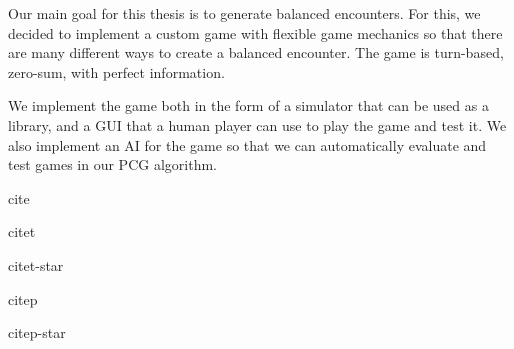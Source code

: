 Our main goal for this thesis is to generate balanced encounters. For this, we decided
to implement a custom game with flexible game mechanics so that there are many different
ways to create a balanced encounter. The game is turn-based, zero-sum, with perfect information.

We implement the game both in the form of a simulator that can be used as a library,
and a GUI that a human player can use to play the game and test it. We also implement
an AI for the game so that we can automatically evaluate and test games in our PCG algorithm.


cite \cite{Genberget08}

citet \citet{Genberget08}

citet-star \citet*{Genberget08}

citep \citep{Genberget08}

citep-star \citep*{Genberget08}

